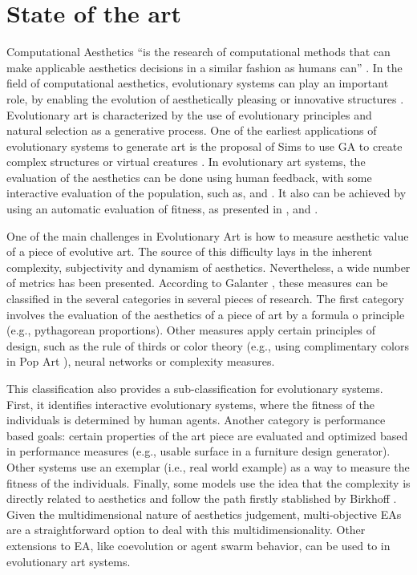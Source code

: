 \documentclass[conference]{IEEEtran}
\begin{document}
\section{State of the art}
\label{sec:soa}
Computational Aesthetics ``is the research of computational methods that can make applicable aesthetics decisions in a similar fashion as humans can'' \cite{COMPAESTH}. In the field of computational aesthetics, evolutionary systems can play an important role, by enabling the evolution of aesthetically pleasing or innovative structures \cite{dipaola2009incorporating}. Evolutionary art is characterized by the use of evolutionary principles and natural selection as a generative process. One of the earliest applications of evolutionary systems to generate art is the proposal of Sims to use GA to create complex structures \cite{sims1991artificial} or virtual creatures  \cite{sims1994evolving}. In evolutionary art systems, the evaluation of the aesthetics can be done using human feedback, with some interactive evaluation of the population, such as, \cite{ashlock2006evolutionary,draves2006electric,moroni2000vox,sims1991artificial} and \cite{ takagi2001interactive}. It also can be achieved by using an automatic evaluation of fitness, as presented in \cite{aguilar2008robotic,del2005benford,den2010comparing,dipaola2009incorporating,li2012investigating,machado1998computing}, and \cite{sims1994evolving}.

One of the main challenges in Evolutionary Art is how to measure aesthetic value of a piece of evolutive art. The source of this difficulty lays in the inherent complexity, subjectivity and dynamism of aesthetics. Nevertheless, a wide number of metrics has been presented. According to Galanter \cite{galanter2012computational}, these measures can be classified in the several categories in several pieces of research. The first category involves the evaluation of the aesthetics of a piece of art by a formula o principle (e.g., pythagorean proportions). Other measures apply certain principles of design, such as the rule of thirds or color theory (e.g., using complimentary colors in Pop Art \cite{den2012evolving}), neural networks or complexity measures. 

This classification also provides a sub-classification for evolutionary systems. First, it identifies interactive evolutionary systems, where the fitness of the individuals is determined by human agents. Another category is performance based goals: certain properties of the art piece are evaluated and optimized based in performance measures (e.g., usable surface in a furniture design generator). Other systems use an exemplar (i.e., real world example) as a way to measure the fitness of the individuals. Finally, some models use the idea that the complexity is directly related to aesthetics and follow the path firstly stablished by Birkhoff \cite{birkhoff2003aesthetic}.  Given the multidimensional nature of aesthetics judgement, multi-objective EAs are a straightforward option to deal with this multidimensionality. Other extensions to EA, like coevolution or agent swarm behavior, can be used to in evolutionary art systems.
\end{document}
